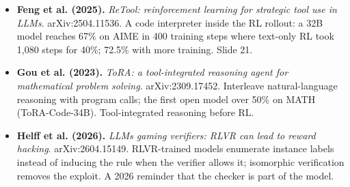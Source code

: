 \documentclass[11pt,letterpaper]{article}
\begin{document}
\begin{itemize}[leftmargin=1.2em,itemsep=3pt]
\item \textbf{Feng et al. (2025).} \textit{ReTool: reinforcement learning for strategic tool use in LLMs}. arXiv:2504.11536. A code interpreter inside the RL rollout: a 32B model reaches 67\% on AIME in 400 training steps where text-only RL took 1,080 steps for 40\%; 72.5\% with more training. Slide 21.
\item \textbf{Gou et al. (2023).} \textit{ToRA: a tool-integrated reasoning agent for mathematical problem solving}. arXiv:2309.17452. Interleave natural-language reasoning with program calls; the first open model over 50\% on MATH (ToRA-Code-34B). Tool-integrated reasoning before RL.
\item \textbf{Helff et al. (2026).} \textit{LLMs gaming verifiers: RLVR can lead to reward hacking}. arXiv:2604.15149. RLVR-trained models enumerate instance labels instead of inducing the rule when the verifier allows it; isomorphic verification removes the exploit. A 2026 reminder that the checker is part of the model.
\end{itemize}
\end{document}

